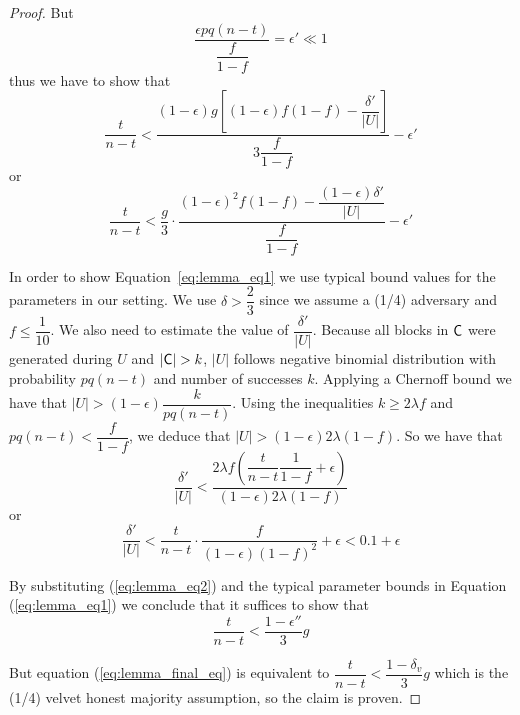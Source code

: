 \begin{proof}
But
\begin{equation*}
    \dfrac{\epsilon pq(n-t)}{\dfrac{f}{1-f}} = \epsilon' \ll 1
\end{equation*} thus we have to show that
\begin{equation*}
    \dfrac{t}{n-t} < \dfrac{  (1- \epsilon)g[ (1-\epsilon)f(1-f) - \dfrac{\delta'}{\lvert U \rvert} ] }  { 3 \dfrac{f}{1-f}} - \epsilon'
\end{equation*} or
\begin{equation}\label{eq:lemma_eq1}
    \dfrac{t}{n-t} < \dfrac{g}{3} \cdot \dfrac{(1-\epsilon)^2 f(1-f) - \dfrac{(1-\epsilon)\delta'}{\lvert U \rvert} }{\dfrac{f}{1-f}} - \epsilon'
\end{equation}

In order to show Equation~\ref{eq:lemma_eq1} we use typical bound values for the parameters in our setting. We use $\delta > \dfrac{2}{3}$ since we assume a (1/4) adversary and $f \leq \dfrac{1}{10}$. We also need to estimate the value of $\dfrac{\delta'}{\lvert U \rvert}$. Because all blocks in $\mathsf{C}$ were generated during $U$ and $\lvert \mathsf{C} \rvert > k $, $\lvert U \rvert$ follows negative binomial distribution with probability $pq(n-t)$ and number of successes $k$.
Applying a Chernoff bound we have that $\lvert U \rvert > (1-\epsilon) \dfrac{k}{pq(n-t)}$. Using the inequalities $k \geq 2\lambda f$ and $pq(n-t) < \dfrac{f}{1-f}$, we deduce that $\lvert U \rvert > (1-\epsilon)2\lambda(1-f)$. So we have that
\begin{equation*}
    \dfrac{\delta'}{\lvert U \rvert} < \dfrac{2\lambda f (\dfrac{t}{n-t} \dfrac{1}{1-f} + \epsilon)}{(1-\epsilon)2\lambda (1-f)}
\end{equation*} or
\begin{equation}\label{eq:lemma_eq2}
    \dfrac{\delta'}{\lvert U \rvert} < \dfrac{t}{n-t} \cdot \dfrac{f}{(1-\epsilon)(1-f)^2} + \epsilon < 0.1 + \epsilon
\end{equation}

By substituting (\ref{eq:lemma_eq2}) and the typical parameter bounds in Equation (\ref{eq:lemma_eq1}) we conclude that it suffices to show that
\begin{equation}\label{eq:lemma_final_eq}
    \dfrac{t}{n-t} < \dfrac{1-\epsilon''}{3}g
\end{equation}

But equation (\ref{eq:lemma_final_eq}) is equivalent to $\dfrac{t}{n-t} < \dfrac{1-\delta_v}{3}g$ which is the (1/4) velvet honest majority assumption, so the claim is proven.
\end{proof}

